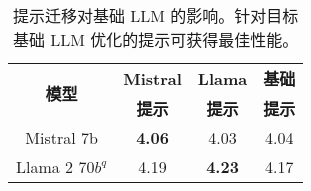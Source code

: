 \begin{table}[!t]
\begin{center}
\begin{tabular}{ c c c c }
    \toprule
    \multirow{2}{*}{\textbf{模型}} & \textbf{Mistral}  & \textbf{Llama}  & \textbf{基础} \\
    & \textbf{提示} & \textbf{提示} & \textbf{提示} \\
    \midrule
    Mistral 7b & \textbf{4.06} & 4.03 & 4.04 \\
    Llama 2 70$b^q$ & 4.19 & \textbf{4.23} & 4.17 \\
    \bottomrule
\end{tabular}
\caption{提示迁移对基础 LLM 的影响。针对目标基础 LLM 优化的提示可获得最佳性能。}
\label{tab:prompt_transfer}
\vspace{-17pt}
\end{center}
\end{table}
